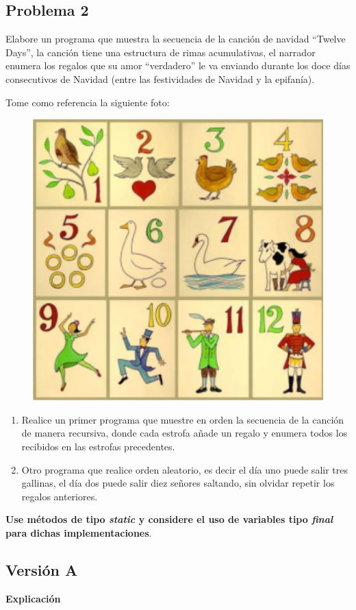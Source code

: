 \documentclass[11pt, twocolumn]{article}
\begin{document}
  \subsection*{Problema 2}
  Elabore un programa que muestra la secuencia de la canción de navidad ``Twelve Days'', la canción tiene una estructura de rimas acumulativas, el narrador enumera los regalos que su amor ``verdadero'' le va enviando durante los doce días consecutivos de Navidad (entre las festividades de Navidad y la epifanía).

  Tome como referencia la siguiente foto:
  \begin{figure}[ht]
    \includegraphics[width=0.6\columnwidth, center]{Cancion.png}
  \end{figure}

  \begin{enumerate}[label=\alph*)]
    \item Realice un primer programa que muestre en orden la secuencia de la canción de manera recursiva, donde cada estrofa añade un regalo y enumera todos los recibidos en las estrofas precedentes.
    \item Otro programa que realice orden aleatorio, es decir el día uno puede salir tres gallinas, el día dos puede salir diez señores saltando, sin olvidar repetir los regalos anteriores.
  \end{enumerate}

  \textbf{Use métodos de tipo \textit{static} y considere el uso de variables tipo \textit{final} para dichas implementaciones}.

  \subsection*{Versión A}


  \textbf{Explicación} 
\end{document}
